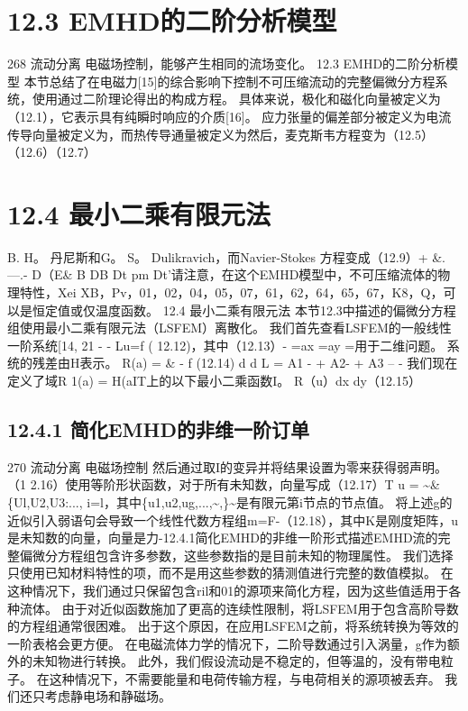 \documentclass[UTF8,11pt,a4paper,openany,fontset=fandol]{ctexbook}
\begin{document}
\section{12.3 EMHD的二阶分析模型}
268 流动分离 电磁场控制，能够产生相同的流场变化。 12.3 EMHD的二阶分析模型 本节总结了在电磁力[15]的综合影响下控制不可压缩流动的完整偏微分方程系统，使用通过二阶理论得出的构成方程。 具体来说，极化和磁化向量被定义为（12.1），它表示具有纯瞬时响应的介质[16]。 应力张量的偏差部分被定义为电流传导向量被定义为，而热传导通量被定义为然后，麦克斯韦方程变为（12.5）（12.6）（12.7）

\section{12.4 最小二乘有限元法}
B. H。 丹尼斯和G。 S。 Dulikravich，而Navier-Stokes 方程变成（12.9）+ \&.---.- D（E\& B DB Dt pm Dt'请注意，在这个EMHD模型中，不可压缩流体的物理特性，Xei XB，Pv，01，02，04，05，07，61，62，64，65，67，K8，Q，可以是恒定值或仅温度函数。 12.4 最小二乘有限元法 本节12.3中描述的偏微分方程组使用最小二乘有限元法（LSFEM）离散化。 我们首先查看LSFEM的一般线性一阶系统[14, 21 - - Lu=f ( 12.12)，其中（12.13）- =ax =ay =用于二维问题。 系统的残差由H表示。 R(a) = \& - f (12.14) d d L = A1 - + A2- + A3 -- - 我们现在定义了域R 1(a) = H(aIT上的以下最小二乘函数I。 R（u）dx dy（12.15）

\subsection{12.4.1 简化EMHD的非维一阶订单}
270 流动分离 电磁场控制 然后通过取I的变异并将结果设置为零来获得弱声明。 （1 2.16）使用等阶形状函数，对于所有未知数，向量写成（12.17）T u = \textasciitilde{}\&\{Ul,U2,U3:..., i=l，其中\{u1,u2,ug,...,\textasciitilde{},\}\textasciitilde{}是有限元第i节点的节点值。 将上述g的近似引入弱语句会导致一个线性代数方程组m=F-（12.18），其中K是刚度矩阵，u是未知数的向量，向量是力-12.4.1简化EMHD的非维一阶形式描述EMHD流的完整偏微分方程组包含许多参数，这些参数指的是目前未知的物理属性。 我们选择只使用已知材料特性的项，而不是用这些参数的猜测值进行完整的数值模拟。 在这种情况下，我们通过只保留包含ril和01的源项来简化方程，因为这些值适用于各种流体。 由于对近似函数施加了更高的连续性限制，将LSFEM用于包含高阶导数的方程组通常很困难。 出于这个原因，在应用LSFEM之前，将系统转换为等效的一阶表格会更方便。 在电磁流体力学的情况下，二阶导数通过引入涡量，g作为额外的未知物进行转换。 此外，我们假设流动是不稳定的，但等温的，没有带电粒子。 在这种情况下，不需要能量和电荷传输方程，与电荷相关的源项被丢弃。 我们还只考虑静电场和静磁场。
\end{document}
